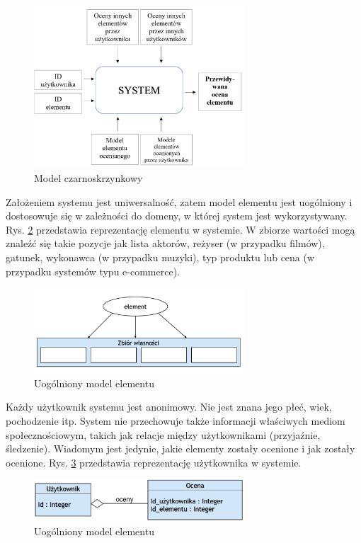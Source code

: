 \documentclass[twoside]{iisthesis}
\begin{document}
 \begin{figure}[!ht] 
   	\centering
   	\includegraphics[width=0.7\textwidth]{blackbox}
   	\caption{Model czarnoskrzynkowy}
   	\label{fig:blackbox}
 \end{figure}
 
 Założeniem systemu jest uniwersalność, zatem model elementu jest uogólniony i dostosowuje się w zależności do domeny, w której system jest wykorzystywany. Rys. \ref{fig:modelElementu} przedstawia reprezentację elementu w systemie. W zbiorze wartości mogą znaleźć się takie pozycje jak lista aktorów, reżyser (w przypadku filmów), gatunek, wykonawca (w przypadku muzyki), typ produktu lub cena (w przypadku systemów typu e-commerce).
 
 \begin{figure}[!ht] 
 	\centering
 	\includegraphics[width=0.7\textwidth]{modelElementu}
 	\caption{Uogólniony model elementu}
 	\label{fig:modelElementu}
 \end{figure}
 
 Każdy użytkownik systemu jest anonimowy. Nie jest znana jego płeć, wiek, pochodzenie itp. System nie przechowuje także informacji właściwych mediom społecznościowym, takich jak relacje między użytkownikami (przyjaźnie, śledzenie). Wiadomym jest jedynie, jakie elementy zostały ocenione i jak zostały ocenione. Rys. \ref{fig:modelUsera} przedstawia reprezentację użytkownika w systemie.
 
 \begin{figure}[!ht] 
  	\centering
  	\includegraphics[width=0.7\textwidth]{modelUsera}
  	\caption{Uogólniony model elementu}
  	\label{fig:modelUsera}
  \end{figure}
\end{document}
